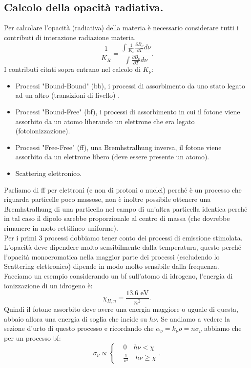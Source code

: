 \subsection{Calcolo della opacità radiativa.}%
\label{sub:Calcolo della opacità radiativa.}
Per calcolare l'opacità (radiativa) della materia è necessario considerare tutti i contributi di interazione radiazione materia.
\[
    \frac{1}{K_R}= \frac{\int \frac{1}{K_\nu }\frac{\partial B_\nu}{\partial T} d\nu}{\int\frac{\partial B_\nu}{\partial T} d\nu}
.\] 
I contributi citati sopra entrano nel calcolo di $K_\nu$:
\begin{itemize}
    \item Processi "Bound-Bound" (bb), i processi di assorbimento da uno stato legato ad un altro (transizioni di livello) .
    \item Processi "Bound-Free" (bf), i processi di assorbimento in cui il fotone viene assorbito da un atomo liberando un elettrone che era legato (fotoionizzazione).
    \item Processi "Free-Free" (ff), una Bremhstralhung inversa, il fotone viene assorbito da un elettrone libero (deve essere presente un atomo).
    \item Scattering elettronico.
\end{itemize}
Parliamo di ff per elettroni (e non di protoni o nuclei) perché è un processo che riguarda particelle poco massose, non è inoltre possibile ottenere una Bremhstralhung di una particella nel campo di un'altra particella identica perché in tal caso il dipolo sarebbe proporzionale al centro di massa (che dovrebbe rimanere in moto rettilineo uniforme). \\
Per i primi 3 processi dobbiamo tener conto dei processi di emissione stimolata.\\
L'opacità deve dipendere molto sensibilmente dalla temperatura, questo perché l'opacità monocromatica nella maggior parte dei processi (escludendo lo Scattering elettronico) dipende in modo molto sensibile dalla frequenza.\\
Facciamo un esempio considerando un bf sull'atomo di idrogeno, l'energia di ionizzazione di un idrogeno è:
\[
    \chi_{H,n} = \frac{13.6 \text{ eV}}{n^2}
.\] 
Quindi il fotone assorbito deve avere una energia maggiore o uguale di questa, abbaio allora una energia di soglia che incide su $h \nu$. Se andiamo a vedere la sezione d'urto di questo processo e ricordando che $\alpha_\nu  = k_\nu  \rho = n\sigma_\nu $ abbiamo che per un processo bf:
\[
\sigma_\nu  \propto \begin{cases}
    &0 \quad h\nu < \chi\\
    &\frac{1}{\nu^3} \quad h\nu  \ge \chi
\end{cases}
.\] 
